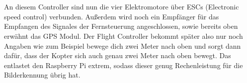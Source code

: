 \\
\\
An diesem Controller sind nun die vier Elektromotore über ESCs (Electronic speed control) verbunden. Außerdem wird noch ein Empfänger für das Empfangen des Signales der Fernsteuerung angeschlossen, sowie bereits oben erwähnt das GPS Modul. Der Flight Controller bekommt später also nur noch Angaben wie zum Beispiel bewege dich zwei Meter nach oben und sorgt dann dafür, dass der Kopter sich auch genau zwei Meter nach oben bewegt. Das entlastet den Raspberry Pi extrem, sodass dieser genug Rechenleistung für die Bilderkennung übrig hat.

